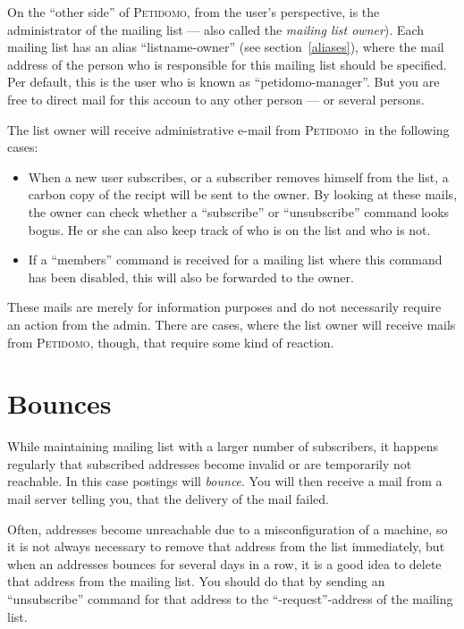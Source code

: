 \documentclass[a4paper]{report}
\newcommand{\Petidomo}{{\scshape Peti\-domo}}
\newcommand{\Def}[1]{{\index{#1}\sl #1}}
\begin{document}
On the ``other side'' of \Petidomo, from the user's
perspective, is the administrator of the mailing list --- also called
the \Def{mailing list owner}). Each mailing list has an
alias ``listname-owner'' (see section~\ref{aliases}), where the mail
address of the person who is responsible for this mailing list should
be specified. Per default, this is the user who is known as
``petidomo-manager''. But you are free to direct mail for this accoun
to any other person --- or several persons.

The list owner will receive administrative e-mail from \Petidomo\ in
the following cases:

\begin{itemize}

\item When a new user subscribes, or a subscriber removes himself from
the list, a carbon copy of the recipt will be sent to the owner. By
looking at these mails, the owner can check whether a ``subscribe'' or
``unsubscribe'' command looks bogus. He or she can also keep track of
who is on the list and who is not.

\item If a ``members'' command is received for a mailing list where
this command has been disabled, this will also be forwarded to the
owner.

\end{itemize}

These mails are merely for information purposes and do not necessarily
require an action from the admin. There are cases, where the list
owner will receive mails from \Petidomo, though, that require some
kind of reaction.

\section{Bounces}

While maintaining mailing list with a larger number of subscribers, it
happens regularly that subscribed addresses become invalid or are
temporarily not reachable. In this case postings will \Def{bounce}.
You will then receive a mail from a mail server telling you, that the
delivery of the mail failed.

Often, addresses become unreachable due to a misconfiguration of a
machine, so it is not always necessary to remove that address from the
list immediately, but when an addresses bounces for several days in a
row, it is a good idea to delete that address from the mailing list.
You should do that by sending an ``unsubscribe'' command for that
address to the ``-request''-address of the mailing list.
\end{document}
